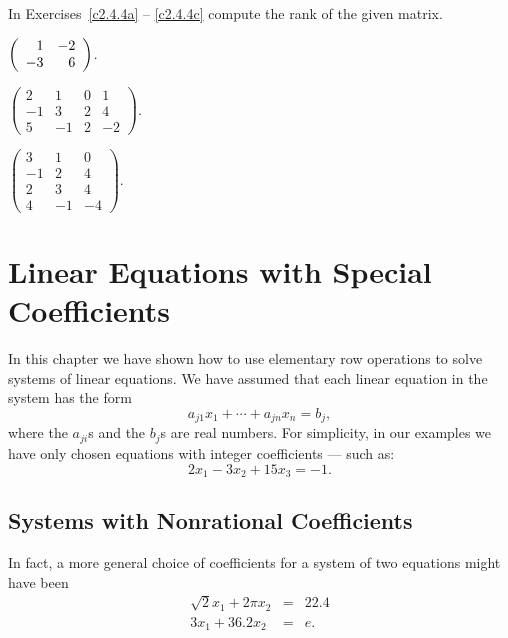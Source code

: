 \noindent In Exercises~\ref{c2.4.4a} -- \ref{c2.4.4c} compute the rank of
the given matrix.
\begin{exercise} \label{c2.4.4a}
$\left(\begin{array}{rr} 1 & -2\\ -3 &6\end{array}\right)$.
\end{exercise}
\begin{exercise} \label{c2.4.4b}
$\left(\begin{array}{rrrr} 2 & 1 & 0 & 1\\
	-1 & 3 & 2 & 4\\ 5 & -1 & 2 & -2\end{array}\right)$.
\end{exercise}
\begin{exercise} \label{c2.4.4c}
$\left(\begin{array}{rrr} 3 & 1 & 0 \\
	-1 & 2 & 4\\ 2 & 3 & 4 \\ 4 & -1 & -4 \end{array}\right)$.
\end{exercise}




\section{Linear Equations with Special Coefficients}
\label{S:specialcoeff}

In this chapter we have shown how to use elementary row
operations to solve systems of linear equations.  We have
assumed that each linear equation in the system has the form
\[
a_{j1}x_1 + \cdots + a_{jn}x_n = b_j,
\]
where the $a_{ji}$s and the $b_j$s are real numbers.  For
simplicity, in our examples we have only chosen equations with
integer coefficients --- such as:
\[
2x_1 - 3x_2 +15x_3 = -1.
\]

\subsection*{Systems with Nonrational Coefficients}

In fact, a more general choice of coefficients for a system of
two equations might have been
\begin{eqnarray}
\sqrt{2}x_1 + 2\pi x_2 & = & 22.4  \nonumber \\
3x_1+36.2 x_2 & = & e. \label{e:irrat}
\end{eqnarray}   

